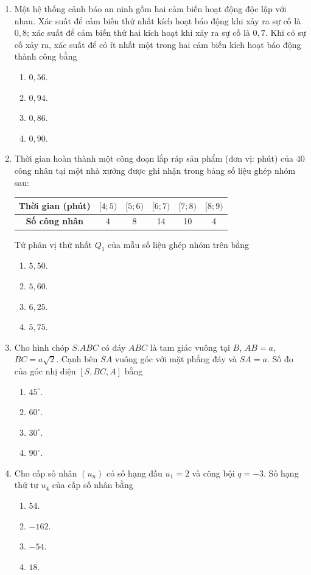 \documentclass[12pt,a4paper]{article}
\begin{document}
\begin{enumerate}[label=\textbf{Câu \arabic*:}, leftmargin=*]
\item Một hệ thống cảnh báo an ninh gồm hai cảm biến hoạt động độc lập với nhau. Xác suất để cảm biến thứ nhất kích hoạt báo động khi xảy ra sự cố là $0{,}8$; xác suất để cảm biến thứ hai kích hoạt khi xảy ra sự cố là $0{,}7$. Khi có sự cố xảy ra, xác suất để có ít nhất một trong hai cảm biến kích hoạt báo động thành công bằng
\begin{enumerate}[label=\Alph*.]
    \item $0{,}56$.
    \item $0{,}94$.
    \item $0{,}86$.
    \item $0{,}90$.
\end{enumerate}

\item Thời gian hoàn thành một công đoạn lắp ráp sản phẩm (đơn vị: phút) của $40$ công nhân tại một nhà xưởng được ghi nhận trong bảng số liệu ghép nhóm sau:
\begin{center}
\begin{tabular}{|c|c|c|c|c|c|}
\hline
\textbf{Thời gian (phút)} & $[4; 5)$ & $[5; 6)$ & $[6; 7)$ & $[7; 8)$ & $[8; 9)$ \\ \hline
\textbf{Số công nhân} & 4 & 8 & 14 & 10 & 4 \\ \hline
\end{tabular}
\end{center}
Tứ phân vị thứ nhất $Q_1$ của mẫu số liệu ghép nhóm trên bằng
\begin{enumerate}[label=\Alph*.]
    \item $5{,}50$.
    \item $5{,}60$.
    \item $6{,}25$.
    \item $5{,}75$.
\end{enumerate}

\item Cho hình chóp $S.ABC$ có đáy $ABC$ là tam giác vuông tại $B$, $AB = a$, $BC = a\sqrt{2}$. Cạnh bên $SA$ vuông góc với mặt phẳng đáy và $SA = a$. Số đo của góc nhị diện $[S, BC, A]$ bằng
\begin{enumerate}[label=\Alph*.]
    \item $45^\circ$.
    \item $60^\circ$.
    \item $30^\circ$.
    \item $90^\circ$.
\end{enumerate}

\item Cho cấp số nhân $(u_n)$ có số hạng đầu $u_1 = 2$ và công bội $q = -3$. Số hạng thứ tư $u_4$ của cấp số nhân bằng
\begin{enumerate}[label=\Alph*.]
    \item $54$.
    \item $-162$.
    \item $-54$.
    \item $18$.
\end{enumerate}


\end{enumerate}
\end{document}
